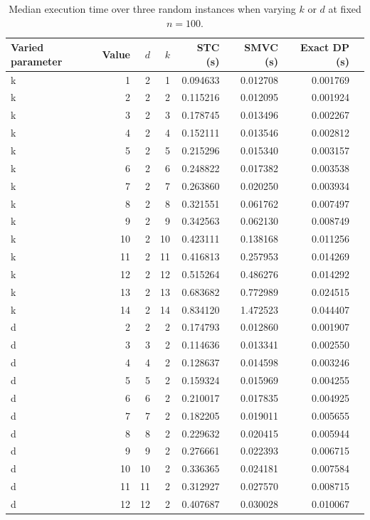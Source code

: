 \begin{table}[t]
\centering
\scriptsize
\caption{Median execution time over three random instances when varying $k$ or $d$ at fixed $n=100$.}
\label{tab:experiment-3-runtime}
\begin{tabular}{lrrrrrrr}
\toprule
Varied parameter & Value & $d$ & $k$ & STC (s) & SMVC (s) & Exact DP (s) \\
\midrule
k & 1 & 2 & 1 & 0.094633 & 0.012708 & 0.001769 \\
k & 2 & 2 & 2 & 0.115216 & 0.012095 & 0.001924 \\
k & 3 & 2 & 3 & 0.178745 & 0.013496 & 0.002267 \\
k & 4 & 2 & 4 & 0.152111 & 0.013546 & 0.002812 \\
k & 5 & 2 & 5 & 0.215296 & 0.015340 & 0.003157 \\
k & 6 & 2 & 6 & 0.248822 & 0.017382 & 0.003538 \\
k & 7 & 2 & 7 & 0.263860 & 0.020250 & 0.003934 \\
k & 8 & 2 & 8 & 0.321551 & 0.061762 & 0.007497 \\
k & 9 & 2 & 9 & 0.342563 & 0.062130 & 0.008749 \\
k & 10 & 2 & 10 & 0.423111 & 0.138168 & 0.011256 \\
k & 11 & 2 & 11 & 0.416813 & 0.257953 & 0.014269 \\
k & 12 & 2 & 12 & 0.515264 & 0.486276 & 0.014292 \\
k & 13 & 2 & 13 & 0.683682 & 0.772989 & 0.024515 \\
k & 14 & 2 & 14 & 0.834120 & 1.472523 & 0.044407 \\
d & 2 & 2 & 2 & 0.174793 & 0.012860 & 0.001907 \\
d & 3 & 3 & 2 & 0.114636 & 0.013341 & 0.002550 \\
d & 4 & 4 & 2 & 0.128637 & 0.014598 & 0.003246 \\
d & 5 & 5 & 2 & 0.159324 & 0.015969 & 0.004255 \\
d & 6 & 6 & 2 & 0.210017 & 0.017835 & 0.004925 \\
d & 7 & 7 & 2 & 0.182205 & 0.019011 & 0.005655 \\
d & 8 & 8 & 2 & 0.229632 & 0.020415 & 0.005944 \\
d & 9 & 9 & 2 & 0.276661 & 0.022393 & 0.006715 \\
d & 10 & 10 & 2 & 0.336365 & 0.024181 & 0.007584 \\
d & 11 & 11 & 2 & 0.312927 & 0.027570 & 0.008715 \\
d & 12 & 12 & 2 & 0.407687 & 0.030028 & 0.010067 \\

\end{tabular}
\end{table}
